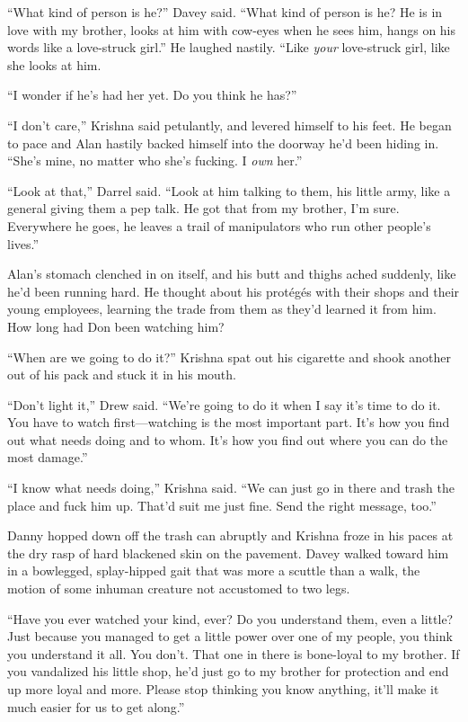 \documentclass{article}
\begin{document}
``What kind of person is he?'' Davey said.  ``What kind of person is
he?  He is in love with my brother, looks at him with cow-eyes when he
sees him, hangs on his words like a love-struck girl.'' He laughed
nastily.  ``Like \textit{your} love-struck girl, like she looks at
him.

``I wonder if he's had her yet.  Do you think he has?''

``I don't care,'' Krishna said petulantly, and levered himself to his
feet.  He began to pace and Alan hastily backed himself into the
doorway he'd been hiding in.  ``She's mine, no matter who she's
fucking.  I \textit{own} her.''

``Look at that,'' Darrel said.  ``Look at him talking to them, his
little army, like a general giving them a pep talk.  He got that from
my brother, I'm sure.  Everywhere he goes, he leaves a trail of
manipulators who run other people's lives.''

Alan's stomach clenched in on itself, and his butt and thighs ached
suddenly, like he'd been running hard.  He thought about his
prot\'{e}g\'{e}s with their shops and their young employees, learning
the trade from them as they'd learned it from him.  How long had Don
been watching him?

``When are we going to do it?'' Krishna spat out his cigarette and
shook another out of his pack and stuck it in his mouth.

``Don't light it,'' Drew said.  ``We're going to do it when I say it's
time to do it.  You have to watch first---watching is the most
important part.  It's how you find out what needs doing and to whom. 
It's how you find out where you can do the most damage.''

``I know what needs doing,'' Krishna said.  ``We can just go in there
and trash the place and fuck him up.  That'd suit me just fine.  Send
the right message, too.''

Danny hopped down off the trash can abruptly and Krishna froze in his
paces at the dry rasp of hard blackened skin on the pavement.  Davey
walked toward him in a bowlegged, splay-hipped gait that was more a
scuttle than a walk, the motion of some inhuman creature not
accustomed to two legs.

``Have you ever watched your kind, ever?  Do you understand them, even
a little?  Just because you managed to get a little power over one of
my people, you think you understand it all.  You don't.  That one in
there is bone-loyal to my brother.  If you vandalized his little shop,
he'd just go to my brother for protection and end up more loyal and
more.  Please stop thinking you know anything, it'll make it much
easier for us to get along.''
\end{document}
